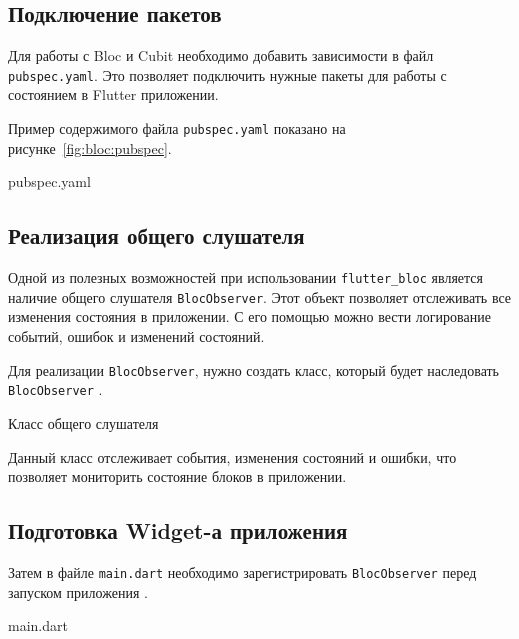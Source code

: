 \subsection{Подключение пакетов}

Для работы с Bloc и Cubit необходимо добавить зависимости
в файл \texttt{pubspec.yaml}.
Это позволяет подключить нужные пакеты
для работы с состоянием в Flutter приложении.

Пример содержимого файла \texttt{pubspec.yaml}
показано на рисунке~\ref{fig:bloc:pubspec}.

\begin{image}
	\caption{pubspec.yaml}
	\label{fig:bloc:pubspec}
\end{image}

\subsection{Реализация общего слушателя}

Одной из полезных возможностей при использовании \texttt{flutter\_bloc}
является наличие общего слушателя \texttt{BlocObserver}.
Этот объект позволяет отслеживать все изменения состояния в приложении.
С его помощью можно вести логирование событий, ошибок и изменений состояний.

Для реализации \texttt{BlocObserver}, нужно создать класс,
который будет наследовать \texttt{BlocObserver} .

\begin{image}
	\caption{Класс общего слушателя}
	\label{fig:bloc:observer}
\end{image}

Данный класс отслеживает события, изменения состояний и ошибки,
что позволяет мониторить состояние блоков в приложении.

\subsection{Подготовка Widget-а приложения}

Затем в файле \texttt{main.dart} необходимо зарегистрировать
\texttt{BlocObserver} перед запуском приложения .

\begin{image}
	\caption{main.dart}
	\label{fig:bloc:main}
\end{image}

